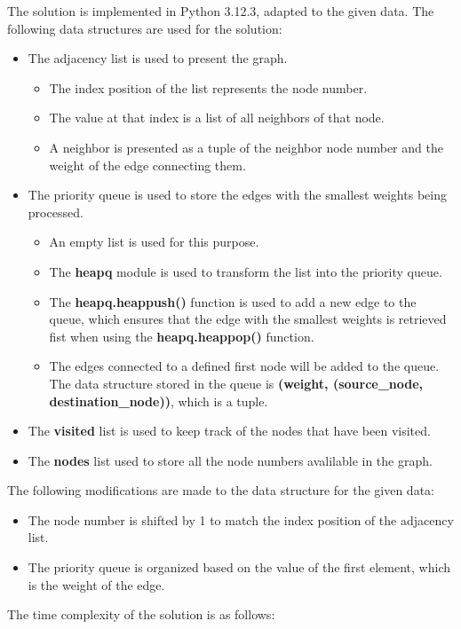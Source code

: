 \documentclass{article}
\begin{document}
  The solution is implemented in Python 3.12.3, adapted to the given data. 
  The following data structures are used for the solution: 
  \begin{itemize}
    \item The adjacency list is used to present the graph. 
    \begin{itemize}
      \item The index position of the list represents the node number.
      \item The value at that index is a list of all neighbors of that node. 
      \item A neighbor is presented as a tuple of the neighbor node number and the weight of the edge connecting them. 
    \end{itemize}
    \item The priority queue is used to store the edges with the smallest weights being processed. 
    \begin{itemize}
      \item An empty list is used for this purpose. 
      \item The \textbf{heapq} module is used to transform the list into the priority queue. 
      \item The \textbf{heapq.heappush()} function is used to add a new edge to the queue, which 
      ensures that the edge with the smallest weights is retrieved fist when using the \textbf{heapq.heappop()} function.
      \item The edges connected to a defined first node will be added to the queue. 
      The data structure stored in the queue is \textbf{(weight, (source\_node, destination\_node))}, 
      which is a tuple.
    \end{itemize}
    \item The \textbf{visited} list is used to keep track of the nodes that have been visited.
    \item The \textbf{nodes} list used to store all the node numbers avalilable in the graph.
  \end{itemize}
  
  The following modifications are made to the data structure for the given data: 
  \begin{itemize}
    \item The node number is shifted by 1 to match the index position of the adjacency list.
    \item The priority queue is organized based on the value of the first element, which is the weight of the edge.
  \end{itemize}

  The time complexity of the solution is as follows:
\end{document}
